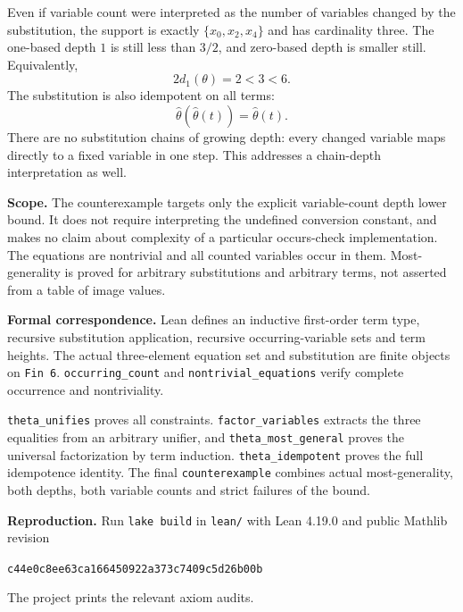 \documentclass[11pt]{article}
\begin{document}
Even if variable count were interpreted as the number of variables
changed by the substitution, the support is exactly
$\{x_0,x_2,x_4\}$ and has cardinality three.
The one-based depth $1$ is still less than $3/2$, and zero-based
depth is smaller still. Equivalently,
\[
 2d_1(\theta)=2<3<6.
\]
The substitution is also idempotent on all terms:
\[
 \widehat\theta(\widehat\theta(t))=\widehat\theta(t).
\]
There are no substitution chains of growing depth: every changed
variable maps directly to a fixed variable in one step.
This addresses a chain-depth interpretation as well.

\textbf{Scope.}
The counterexample targets only the explicit variable-count depth
lower bound. It does not require interpreting the undefined
conversion constant, and makes no claim about complexity of a
particular occurs-check implementation.
The equations are nontrivial and all counted variables occur in
them. Most-generality is proved for arbitrary substitutions
and arbitrary terms, not asserted from a table of image values.

\textbf{Formal correspondence.}
Lean defines an inductive first-order term type, recursive
substitution application, recursive occurring-variable sets and
term heights. The actual three-element equation set and substitution
are finite objects on \texttt{Fin 6}.
\texttt{occurring\_count} and \texttt{nontrivial\_equations}
verify complete occurrence and nontriviality.

\texttt{theta\_unifies} proves all constraints.
\texttt{factor\_variables} extracts the three equalities from an
arbitrary unifier, and \texttt{theta\_most\_general} proves the
universal factorization by term induction.
\texttt{theta\_idempotent} proves the full idempotence identity.
The final \texttt{counterexample} combines actual most-generality,
both depths, both variable counts and strict failures of the bound.

\textbf{Reproduction.}
Run \texttt{lake build} in \texttt{lean/} with Lean 4.19.0 and
public Mathlib revision
\begin{center}\small\texttt{c44e0c8ee63ca166450922a373c7409c5d26b00b}\end{center}
The project prints the relevant axiom audits.
\end{document}

